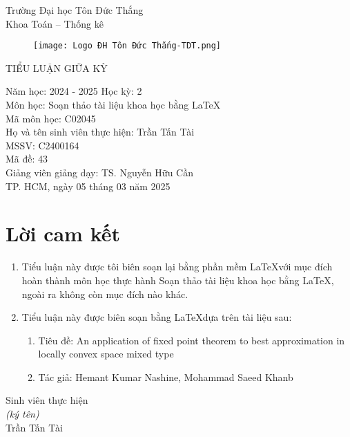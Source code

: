 \documentclass[12pt,a4paper,two side]{article}
\begin{document}
\begin{titlepage}
		\centering
		Trường Đại học Tôn Đức Thắng\\
		Khoa Toán – Thống kê\\[2cm]
\begin{figure}[h]
	\centering
	\texttt{[image: Logo ĐH Tôn Đức Thắng-TDT.png]}
	
	\label{fig:logo-h-ton-uc-thang-tdt}
\end{figure}

	

		
	
	
		\huge
		TIỂU LUẬN GIỮA KỲ\\[2cm]
		\normalsize
		
		Năm học: 2024 - 2025 Học kỳ: 2\\[2cm]
		Môn học: Soạn thảo tài liệu khoa học bằng \LaTeX\\
		Mã môn học: C02045\\[2cm]
		Họ và tên sinh viên thực hiện: Trần Tấn Tài\\
		MSSV: C2400164\\[2cm]
		Mã đề: 43\\[2cm]
		Giảng viên giảng dạy: TS. Nguyễn Hữu Cần\\
		\vfill
		TP. HCM, ngày 05 tháng 03 năm 2025
	\end{titlepage}
	
	\section*{Lời cam kết}
	\begin{enumerate}[]
		\item Tiểu luận này được tôi biên soạn lại bằng phần mềm \LaTeX với mục đích hoàn
		thành môn học thực hành Soạn thảo tài liệu khoa học bằng \LaTeX, ngoài ra
		không còn mục đích nào khác.
		\item Tiểu luận này được biên soạn bằng \LaTeX dựa trên tài liệu sau:
		\begin{enumerate}[]
			\item Tiêu đề: An application of fixed point theorem to best approximation in locally
			convex space
			mixed type
			\item Tác giả: Hemant Kumar Nashine, Mohammad Saeed Khanb
		\end{enumerate}
	\end{enumerate}
	
	\begin{flushright}
		\begin{minipage}{.3\textwidth}
			\centering 
			Sinh viên thực hiện\\[1cm]
			\textit{(ký tên)}\\[1cm]
			Trần Tấn Tài
		\end{minipage}
	\end{flushright}
	\newpage
	
\end{document}
